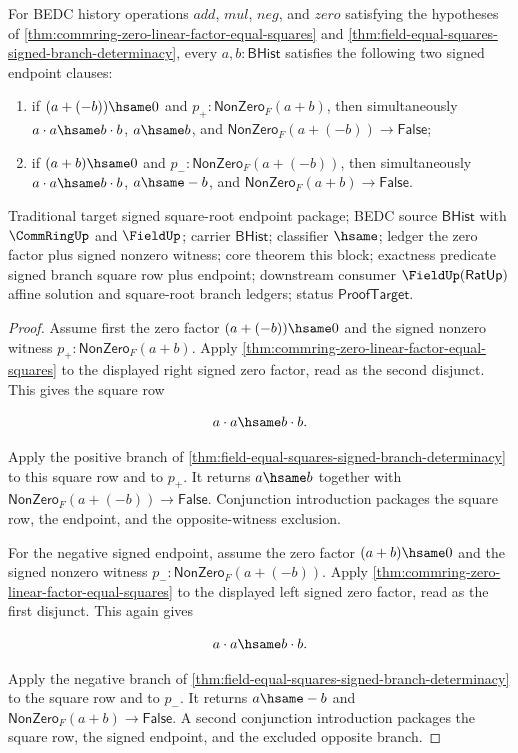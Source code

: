 \begin{theorem}
\label{thm:field-zero-linear-factor-signed-endpoint-package}
For BEDC history operations $add$, $mul$, $neg$, and $zero$ satisfying the
hypotheses of
\autoref{thm:commring-zero-linear-factor-equal-squares} and
\autoref{thm:field-equal-squares-signed-branch-determinacy}, every
$a,b:\mathsf{BHist}$ satisfies the following two signed endpoint clauses:
\begin{enumerate}
  \item if $(a+(-b))\hsame0$ and $p_+:\mathsf{NonZero}_F(a+b)$, then
  simultaneously $a\cdot a\hsame b\cdot b$, $a\hsame b$, and
  $\mathsf{NonZero}_F(a+(-b))\to\mathsf{False}$;
  \item if $(a+b)\hsame0$ and $p_-:\mathsf{NonZero}_F(a+(-b))$, then
  simultaneously $a\cdot a\hsame b\cdot b$, $a\hsame -b$, and
  $\mathsf{NonZero}_F(a+b)\to\mathsf{False}$.
\end{enumerate}
Traditional target signed square-root endpoint package; BEDC source
$\mathsf{BHist}$ with $\CommRingUp$ and $\FieldUp$; carrier $\mathsf{BHist}$;
classifier $\hsame$; ledger the zero factor plus signed nonzero witness; core
theorem this block; exactness predicate signed branch square row plus endpoint;
downstream consumer $\FieldUp(\mathsf{RatUp})$ affine solution and square-root
branch ledgers; status $\mathsf{ProofTarget}$.
\end{theorem}
\begin{proof}
Assume first the zero factor $(a+(-b))\hsame0$ and the signed nonzero witness
$p_+:\mathsf{NonZero}_F(a+b)$. Apply
\autoref{thm:commring-zero-linear-factor-equal-squares} to the displayed
right signed zero factor, read as the second disjunct. This gives the square
row

$$
a\cdot a\hsame b\cdot b.
$$

Apply the positive branch of
\autoref{thm:field-equal-squares-signed-branch-determinacy} to this square row
and to $p_+$. It returns $a\hsame b$ together with
$\mathsf{NonZero}_F(a+(-b))\to\mathsf{False}$. Conjunction introduction packages
the square row, the endpoint, and the opposite-witness exclusion.

For the negative signed endpoint, assume the zero factor $(a+b)\hsame0$ and the
signed nonzero witness $p_-:\mathsf{NonZero}_F(a+(-b))$. Apply
\autoref{thm:commring-zero-linear-factor-equal-squares} to the displayed left
signed zero factor, read as the first disjunct. This again gives

$$
a\cdot a\hsame b\cdot b.
$$

Apply the negative branch of
\autoref{thm:field-equal-squares-signed-branch-determinacy} to the square row
and to $p_-$. It returns $a\hsame -b$ and
$\mathsf{NonZero}_F(a+b)\to\mathsf{False}$. A second conjunction introduction
packages the square row, the signed endpoint, and the excluded opposite branch.
\end{proof}

